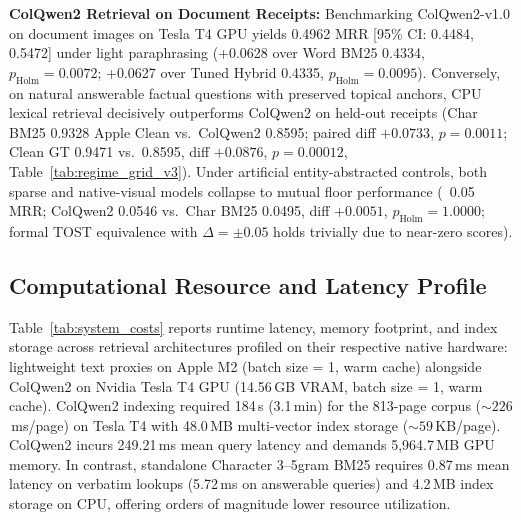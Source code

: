 \textbf{ColQwen2 Retrieval on Document Receipts:} Benchmarking ColQwen2-v1.0 \cite{faysse2024colqwen2} on document images on Tesla T4 GPU yields 0.4962 MRR [95\% CI: 0.4484, 0.5472] under light paraphrasing (+0.0628 over Word BM25 0.4334, $p_{\text{Holm}} = 0.0072$; +0.0627 over Tuned Hybrid 0.4335, $p_{\text{Holm}} = 0.0095$). Conversely, on natural answerable factual questions with preserved topical anchors, CPU lexical retrieval decisively outperforms ColQwen2 on held-out receipts (Char BM25 0.9328 Apple Clean vs.\ ColQwen2 0.8595; paired diff $+0.0733$, $p = 0.0011$; Clean GT 0.9471 vs.\ 0.8595, diff $+0.0876$, $p=0.00012$, Table~\ref{tab:regime_grid_v3}). Under artificial entity-abstracted controls, both sparse and native-visual models collapse to mutual floor performance (~0.05 MRR; ColQwen2 0.0546 vs.\ Char BM25 0.0495, diff $+0.0051$, $p_{\text{Holm}}=1.0000$; formal TOST equivalence with $\Delta=\pm 0.05$ holds trivially due to near-zero scores).

\subsection{Computational Resource and Latency Profile}
\label{sec:system_costs_eval}

Table~\ref{tab:system_costs} reports runtime latency, memory footprint, and index storage across retrieval architectures profiled on their respective native hardware: lightweight text proxies on Apple M2 (batch size = 1, warm cache) alongside ColQwen2 on Nvidia Tesla T4 GPU (14.56\,GB VRAM, batch size = 1, warm cache). ColQwen2 indexing required 184\,s (3.1\,min) for the 813-page corpus ($\sim 226$\,ms/page) on Tesla T4 with 48.0\,MB multi-vector index storage ($\sim 59$\,KB/page). ColQwen2 incurs 249.21\,ms mean query latency and demands 5,964.7\,MB GPU memory. In contrast, standalone Character 3--5gram BM25 requires 0.87\,ms mean latency on verbatim lookups (5.72\,ms on answerable queries) and 4.2\,MB index storage on CPU, offering orders of magnitude lower resource utilization.

